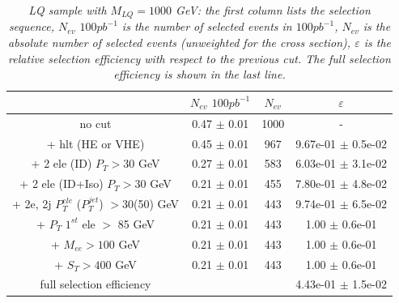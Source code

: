 \begin{table}[htbp]
\begin{center}
\begin{tabular}{|c|c|c|c|}
\hline
\hline
 & $N_{ev}$ $100pb^{-1}$ & $N_{ev}$ & $\varepsilon$ \\
\hline
\hline

no cut &0.47 $\pm$ 0.01& 1000 & - \\
+ hlt (HE or VHE) &0.45 $\pm$ 0.01& 967 & 9.67e-01 $\pm$ 0.5e-02\\
+ 2 ele (ID) $P_{T} >30$ GeV &0.27 $\pm$ 0.01& 583 & 6.03e-01 $\pm$ 3.1e-02\\
+ 2 ele (ID+Iso) $P_{T} >30$ GeV &0.21 $\pm$ 0.01& 455 & 7.80e-01 $\pm$ 4.8e-02\\
+ 2e, 2j $P_{T}^{ele}$ ($P_{T}^{jet}$) $>$30(50) GeV &0.21 $\pm$ 0.01& 443 & 9.74e-01 $\pm$ 6.5e-02\\
+ $P_{T}$ $1^{st}$ ele $>$ 85 GeV &0.21 $\pm$ 0.01& 443 & 1.00 $\pm$ 0.6e-01\\
+ $M_{ee} >100$ GeV&0.21 $\pm$ 0.01& 443 & 1.00 $\pm$ 0.6e-01\\
+ $S_{T} >400$ GeV &0.21 $\pm$ 0.01& 443 & 1.00 $\pm$ 0.6e-01\\
\hline

full selection efficiency& &  & 4.43e-01 $\pm$ 1.5e-02\\
\hline
\end{tabular}
\end{center}
\caption{\small \sl LQ sample with $M_{LQ}=1000$ GeV: the first column lists the selection sequence, $N_{ev}$ $100pb^{-1}$ is the number of selected events in $100pb^{-1}$, $N_{ev}$ is the absolute number of selected events (unweighted for the cross section), $\varepsilon$ is the relative selection efficiency with respect to the previous cut. The full selection efficiency is shown in the last line.}
\label{tab:selection_effic_1000}
\end{table}



